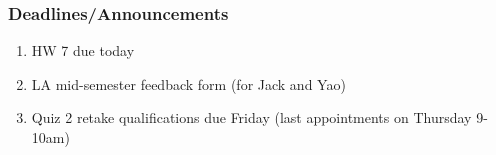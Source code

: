 
\begin{frame}
    \frametitle{Deadlines/Announcements}
\begin{enumerate}
            \item HW 7 due today
            \item LA mid-semester feedback form (for Jack and Yao)
            \item Quiz 2 retake qualifications due Friday (last appointments on Thursday 9-10am)
        \end{enumerate}
\end{frame}
